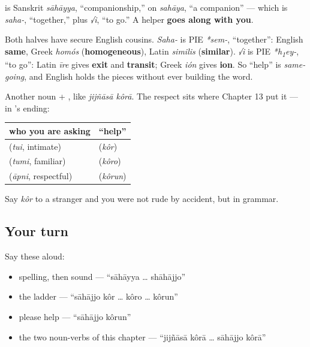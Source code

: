 \begin{cousinweb}
\textbf{} is Sanskrit \emph{sāhāyya}, \textquotedblleft{}companionship,\textquotedblright{} on \emph{sahāya}, \textquotedblleft{}a companion\textquotedblright{} — which is \emph{saha-}, \textquotedblleft{}together,\textquotedblright{} plus \emph{√i}, \textquotedblleft{}to go.\textquotedblright{} A helper \textbf{goes along with you}.

Both halves have secure English cousins. \emph{Saha-} is PIE \emph{*sem-}, \textquotedblleft{}together\textquotedblright{}: English \textbf{same}, Greek \emph{homós} (\textbf{homogeneous}), Latin \emph{similis} (\textbf{similar}). \emph{√i} is PIE \emph{*h\textsubscript{1}ey-}, \textquotedblleft{}to go\textquotedblright{}: Latin \emph{īre} gives \textbf{exit} and \textbf{transit}; Greek \emph{ión} gives \textbf{ion}. So \textquotedblleft{}help\textquotedblright{} is \emph{same-going}, and English holds the pieces without ever building the word.
\end{cousinweb}

\begin{grammarlens}[title={Grammar Lens: asking for help is where the respect ladder bites}]
Another noun + , like \emph{jijñāsā kôrā}. The respect sits where Chapter 13 put it — in ’s ending:

\noindent
\begin{tabularx}{\linewidth}{@{}>{\raggedright\arraybackslash}X>{\raggedright\arraybackslash}X@{}}
\toprule
\textbf{who you are asking} & \textbf{\textquotedblleft{}help\textquotedblright{}} \\
\midrule
\bn{তুই} (\emph{tui}, intimate) & \bn{সাহায্য} \bn{কর} (\emph{kôr}) \\
\bn{তুমি} (\emph{tumi}, familiar) & \bn{সাহায্য} \bn{করো} (\emph{kôro}) \\
\bn{আপনি} (\emph{āpni}, respectful) & \bn{সাহায্য} \bn{করুন} (\emph{kôrun}) \\
\bottomrule
\end{tabularx}

Say \emph{kôr} to a stranger and you were not rude by accident, but in grammar.
\end{grammarlens}

\subsection*{Your turn}
Say these aloud:

\begin{itemize}
\raggedright
  \item spelling, then sound — \textquotedblleft{}sāhāyya … shāhājjo\textquotedblright{}
  \item the ladder — \textquotedblleft{}sāhājjo kôr … kôro … kôrun\textquotedblright{}
  \item please help — \textquotedblleft{}sāhājjo kôrun\textquotedblright{}
  \item the two noun-verbs of this chapter — \textquotedblleft{}jijñāsā kôrā … sāhājjo kôrā\textquotedblright{}
\end{itemize}

